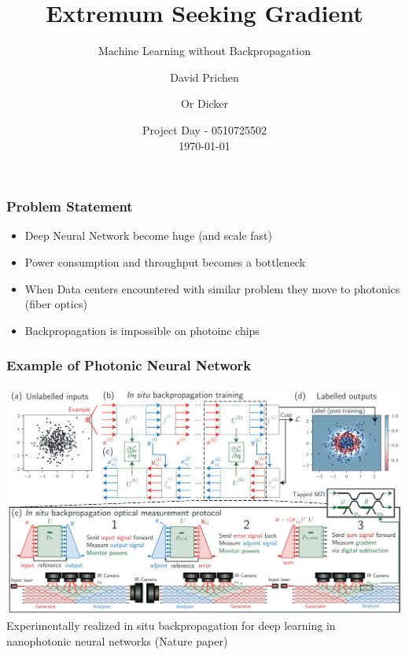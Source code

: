 \documentclass[
	11pt, %
]{beamer}
\title[ESG]{Extremum Seeking Gradient} %
\subtitle{Machine Learning without Backpropagation} %
\author[Prichen, Dicker]{David Prichen \and Or Dicker} %
\institute[TAU]{Tel Aviv University} %
\date[]{Project Day - 0510725502 \\ \today} %
\begin{document}

\begin{frame}
	\titlepage %
\end{frame}






\begin{frame}
  \frametitle{Problem Statement}
  \begin{itemize}
  \item Deep Neural Network become huge (and scale fast)
  \item Power consumption and throughput becomes a bottleneck
  \item When Data centers encountered with similar problem they move to photonics (fiber optics)
  \item Backpropagation is impossible on photoinc chips  
\end{itemize}
    
\end{frame}


\begin{frame}
  \frametitle{Example of Photonic Neural Network}
  \includegraphics[width=0.8\columnwidth]{../report/images/photonic_nn.png}
  Experimentally realized in situ backpropagation for deep learning in nanophotonic
neural networks (Nature paper)
\end{frame}
\end{document}
